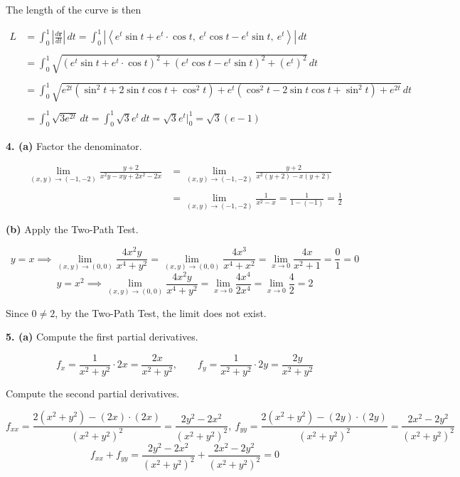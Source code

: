 \documentclass{article}
\begin{document}
The length of the curve is then

\begin{align*}L&=\int_0^1\left|\frac{d\mathbf r}{dt}\right|\,dt=\int_0^1\left|\left\langle e ^t\sin t+ e ^t\cdot\cos t,\: e ^t\cos t- e ^t\sin t,\: e ^t\right\rangle\right|\,dt\\\\&=\int_0^1\sqrt{\left( e ^t\sin t+ e ^t\cdot\cos t\right)^2+\left( e ^t\cos t- e ^t\sin t\right)^2+\left( e ^t\right)^2}\,dt\\\\&=\int_0^1\sqrt{ e ^{2t}\left(\sin^2t+2\sin t\cos t+\cos^2t\right)+ e ^t\left(\cos^2t-2\sin t\cos t+\sin^2t\right)+ e ^{2t}}\,dt\\\\&=\int_0^1\sqrt{3 e ^{2t}}\,dt=\int_0^1\sqrt3 e^t\,dt=\sqrt3 e ^t\bigg|_0^1=\boxed{\sqrt3( e-1)}\end{align*}

\vspace{1em}

\textbf{4. (a)} Factor the denominator.

\begin{align*}\lim_{(x,y)\to(-1,-2)}\frac{y+2}{x^2y-xy+2x^2-2x}&=\lim_{(x,y)\to(-1,-2)}\frac{y+2}{x^2(y+2)-x(y+2)}\\\\&=\lim_{(x,y)\to(-1,-2)}\frac1{x^2-x}=\frac1{1-(-1)}=\boxed{\frac12}\end{align*}

\textbf{(b)} Apply the Two-Path Test.

\[y=x\implies\lim_{(x,y)\to(0,0)}\frac{4x^2y}{x^4+y^2}=\lim_{(x,y)\to(0,0)}\frac{4x^3}{x^4+x^2}=\lim_{x\to0}\frac{4x}{x^2+1}=\frac01=0\]
\[y=x^2\implies\lim_{(x,y)\to(0,0)}\frac{4x^2y}{x^4+y^2}=\lim_{x\to0}\frac{4x^4}{2x^4}=\lim_{x\to0}\frac42=2\]

Since $0\neq2$, by the Two-Path Test, the limit does not exist.

\vspace{1em}

\textbf{5. (a)} Compute the first partial derivatives.

\[f_x=\frac1{x^2+y^2}\cdot2x=\frac{2x}{x^2+y^2},\qquad f_y=\frac1{x^2+y^2}\cdot2y=\frac{2y}{x^2+y^2}\]

Compute the second partial derivatives.

\[f_{xx}=\frac{2\left(x^2+y^2\right)-(2x)\cdot(2x)}{\left(x^2+y^2\right)^2}=\frac{2y^2-2x^2}{\left(x^2+y^2\right)^2},\: f_{yy}=\frac{2\left(x^2+y^2\right)-(2y)\cdot(2y)}{\left(x^2+y^2\right)^2}=\frac{2x^2-2y^2}{\left(x^2+y^2\right)^2}\]
\[f_{xx}+f_{yy}=\frac{2y^2-2x^2}{\left(x^2+y^2\right)^2}+\frac{2x^2-2y^2}{\left(x^2+y^2\right)^2}=\boxed0\]
\end{document}
